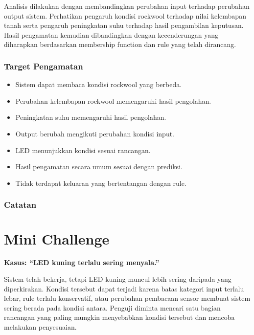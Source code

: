 \documentclass[12pt,a4paper]{article}
\begin{document}
Analisis dilakukan dengan membandingkan perubahan input terhadap perubahan output sistem. Perhatikan pengaruh kondisi rockwool terhadap nilai kelembapan tanah serta pengaruh peningkatan suhu terhadap hasil pengambilan keputusan. Hasil pengamatan kemudian dibandingkan dengan kecenderungan yang diharapkan berdasarkan membership function dan rule yang telah dirancang.

\subsubsection*{Target Pengamatan}

\begin{itemize}
    \item [ ] Sistem dapat membaca kondisi rockwool yang berbeda.
    \item [ ] Perubahan kelembapan rockwool memengaruhi hasil pengolahan.
    \item [ ] Peningkatan suhu memengaruhi hasil pengolahan.
    \item [ ] Output berubah mengikuti perubahan kondisi input.
    \item [ ] LED menunjukkan kondisi sesuai rancangan.
    \item [ ] Hasil pengamatan secara umum sesuai dengan prediksi.
    \item [ ] Tidak terdapat keluaran yang bertentangan dengan rule.
\end{itemize}

\subsubsection*{Catatan}

\noindent
\makebox[\textwidth]{\hrulefill}

\vspace{0.4cm}
\makebox[\textwidth]{\hrulefill}

\vspace{0.4cm}
\makebox[\textwidth]{\hrulefill}

\section{Mini Challenge}

\textbf{Kasus: ``LED kuning terlalu sering menyala.''}

Sistem telah bekerja, tetapi LED kuning muncul lebih sering daripada yang diperkirakan. Kondisi tersebut dapat terjadi karena batas kategori input terlalu lebar, rule terlalu konservatif, atau perubahan pembacaan sensor membuat sistem sering berada pada kondisi antara. Penguji diminta mencari satu bagian rancangan yang paling mungkin menyebabkan kondisi tersebut dan mencoba melakukan penyesuaian.
\end{document}
